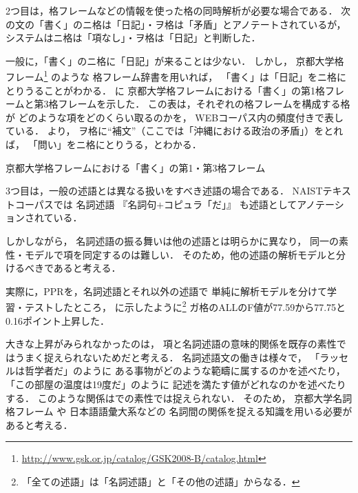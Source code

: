 \documentclass[japanese]{jnlp_1.4}
\let\underline
\newcommand{\tblref}[1]{}
\newcommand{\secref}[1]{}
\newcommand{\enumsentence}[2]{}
\begin{document}
2つ目は，格フレームなどの情報を使った格の同時解析が必要な場合である．
次の文の「書く」のニ格は「日記」・ヲ格は「矛盾」とアノテートされているが，
システムはニ格は「項なし」・ヲ格は「日記」と判断した．

\enumsentence{
\underline{日記}$_{ニ}$には、小説の読後感や将来への夢、希望などをつづるようになり、
高校生になると、大学受験のこと、沖縄における政治の\underline{矛盾}$_{ヲ}$なども\underline{書く}ようになった。
}{error-2}

一般に，「書く」のニ格に「日記」が来ることは少ない．
しかし，
京都大学格フレーム\cite{Kawahara:2005:NLP}\footnote{\url{http://www.gsk.or.jp/catalog/GSK2008-B/catalog.html}}
のような
格フレーム辞書を用いれば，
「書く」は「日記」をニ格にとりうることがわかる．
に
京都大学格フレームにおける「書く」の第1格フレームと第3格フレームを示した．
この表は，それぞれの格フレームを構成する格が
どのような項をどのくらい取るのかを，
WEBコーパス内の頻度付きで表している．
より，
ヲ格に``補文''（ここでは「沖縄における政治の矛盾」）をとれば，
「問い」をニ格にとりうる，とわかる．


\begin{table}[b]
\caption{京都大学格フレームにおける「書く」の第1・第3格フレーム}
\label{tbl:kaku-case}

\end{table}


3つ目は，一般の述語とは異なる扱いをすべき述語の場合である．
NAISTテキストコーパスでは
名詞述語
『名詞句$+$コピュラ「だ」』
も述語としてアノテーションされている．

\enumsentence{
\underline{欧州連合}$_{ガ}$
が十五カ国に拡大して初の交渉となる。
昨年は欧州市場での乗用車の売れ行き回復を受け、規制枠を若干上方修正したが、
今年については「昨年の新車登録台数集
計を踏まえて対応したい」と\underline{慎重姿勢だ}。
}{ex-c}

しかしながら，
名詞述語の振る舞いは他の述語とは明らかに異なり，
同一の素性・モデルで項を同定するのは難しい．
そのため，他の述語の解析モデルと分けるべきであると考える．

実際に，PPRを，名詞述語とそれ以外の述語で
単純に解析モデルを分けて学習・テストしたところ，
に示したように\footnote{「全ての述語」は「名詞述語」と「その他の述語」からなる．}
ガ格のALLのF値が77.59から77.75と0.16ポイント上昇した．


大きな上昇がみられなかったのは，
項と名詞述語の意味的関係を既存の素性ではうまく捉えられないためだと考える．
名詞述語文の働きは様々で，
「ラッセルは哲学者だ」のように
ある事物がどのような範疇に属するのかを述べたり，
「この部屋の温度は19度だ」のように
記述を満たす値がどれなのかを述べたり
する\cite{Imada:2010:DThesis}．
このような関係は\secref{sec:feature}での素性では捉えられない．
そのため，
京都大学名詞格フレーム\cite{Sasano:2005:JNLP}
や
日本語語彙大系\cite{goitaikei}などの
名詞間の関係を捉える知識を用いる必要があると考える．
\end{document}
